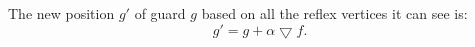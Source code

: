 The new position $g'$ of guard $g$ based on all the reflex vertices it can see is: 
\begin{equation}
    g' = g + \alpha\bigtriangledown f.
    \label{eq:l}
\end{equation}





    

    








